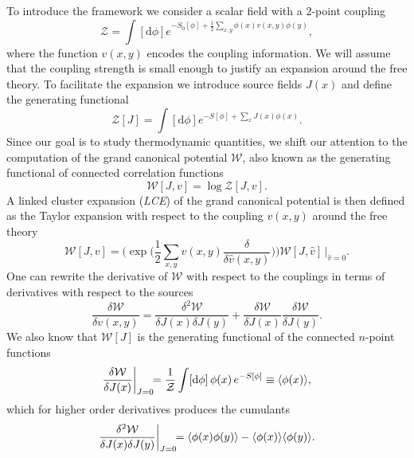 To introduce the framework we consider a scalar field with a $2$-point coupling
%
\begin{equation} \label{eq:scalar_field_Z}
  \mathcal{Z} = \int [\mathrm{d} \phi] e^{-S_0[\phi] + \frac{1}{2} \sum_{x,y}
    \phi(x) v(x,y) \phi(y)},
\end{equation}
%
where the function $v(x,y)$ encodes the coupling information. We will assume that the
coupling strength is small enough to justify an expansion around the free
theory. To facilitate the expansion we introduce source fields $J(x)$ and define
the generating functional
%
\begin{equation}
  \mathcal{Z}[J] = \int [\mathrm{d} \phi] e^{-S[\phi] + \sum_x J(x) \phi(x)}.
\end{equation}
%
Since our goal is to study thermodynamic quantities, we shift our attention to
the computation of the grand canonical potential $\mathcal{W}$, also known as
the generating functional of connected correlation functions
%
\begin{equation}
  \mathcal{W}[J,v] = \log \mathcal{Z}[J,v].
\end{equation}
%
A linked cluster expansion (\emph{LCE}) of the grand canonical potential is then defined as
the Taylor expansion with respect to the coupling $v(x,y)$ around the free
theory
%
\begin{equation} \label{eq:cluster_expansion_def}
  \mathcal{W}[J,v] = \bigg( \exp \bigg(\frac{1}{2} \sum_{x,y} v(x,y)
    \frac{\delta}{\delta \hat{v}(x,y)} \bigg) \bigg) \mathcal{W}[J,\hat{v}]
    \,\Bigg|_{\hat{v}=0}.
\end{equation}
%
One can rewrite the derivative of $\mathcal{W}$ with respect to the couplings in
terms of derivatives with respect to the sources
%
\begin{equation}
  \frac{\delta \mathcal{W}}{\delta v(x,y)} = \frac{\delta^2 \mathcal{W}}{\delta
    J(x) \delta J(y)} + \frac{\delta \mathcal{W}}{\delta J(x)} \frac{\delta \mathcal{W}}{\delta J(y)}.
\end{equation}
%
We also know that $\mathcal{W}[J]$ is the generating functional of the
connected $n$-point functions 
%
\begin{equation}
  \frac{\delta \mathcal{W}}{\delta J(x)} \bigg|_{J=\mathrlap{0}} 
    = \frac{1}{\mathcal{Z}} \int [\mathrm{d} \phi] \, \phi(x) \, e^{-S[\phi]}
    \equiv \langle \phi(x) \rangle,
\end{equation}
%
which for higher order derivatives produces the cumulants
%
\begin{equation}
  \frac{\delta^2 \mathcal{W}}{\delta J(x) \delta J(y)} \bigg|_{J=\mathrlap{0}} 
    = \langle \phi(x) \phi(y) \rangle - \langle \phi(x) \rangle \langle \phi(y) \rangle.
\end{equation}
